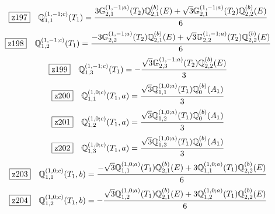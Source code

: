 \documentclass[fleqn,10pt,landscape]{jsarticle}
\begin{document}
\begin{dmath*}
\hspace*{3mm}\fbox{z197}\quad \mathbb{Q}_{1,1}^{(1,-1;c)}(T_{1})=\frac{3 \mathbb{G}_{2,1}^{(1,-1;a)}(T_{2}) \mathbb{Q}_{2,1}^{(b)}(E) + \sqrt{3} \mathbb{G}_{2,1}^{(1,-1;a)}(T_{2}) \mathbb{Q}_{2,2}^{(b)}(E)}{6}
\end{dmath*}
\begin{dmath*}
\hspace*{3mm}\fbox{z198}\quad \mathbb{Q}_{1,2}^{(1,-1;c)}(T_{1})=\frac{- 3 \mathbb{G}_{2,2}^{(1,-1;a)}(T_{2}) \mathbb{Q}_{2,1}^{(b)}(E) + \sqrt{3} \mathbb{G}_{2,2}^{(1,-1;a)}(T_{2}) \mathbb{Q}_{2,2}^{(b)}(E)}{6}
\end{dmath*}
\begin{dmath*}
\hspace*{3mm}\fbox{z199}\quad \mathbb{Q}_{1,3}^{(1,-1;c)}(T_{1})=- \frac{\sqrt{3} \mathbb{G}_{2,3}^{(1,-1;a)}(T_{2}) \mathbb{Q}_{2,2}^{(b)}(E)}{3}
\end{dmath*}
\begin{dmath*}
\hspace*{3mm}\fbox{z200}\quad \mathbb{Q}_{1,1}^{(1,0;c)}(T_{1},a)=\frac{\sqrt{3} \mathbb{Q}_{1,1}^{(1,0;a)}(T_{1}) \mathbb{Q}_{0}^{(b)}(A_{1})}{3}
\end{dmath*}
\begin{dmath*}
\hspace*{3mm}\fbox{z201}\quad \mathbb{Q}_{1,2}^{(1,0;c)}(T_{1},a)=\frac{\sqrt{3} \mathbb{Q}_{1,2}^{(1,0;a)}(T_{1}) \mathbb{Q}_{0}^{(b)}(A_{1})}{3}
\end{dmath*}
\begin{dmath*}
\hspace*{3mm}\fbox{z202}\quad \mathbb{Q}_{1,3}^{(1,0;c)}(T_{1},a)=\frac{\sqrt{3} \mathbb{Q}_{1,3}^{(1,0;a)}(T_{1}) \mathbb{Q}_{0}^{(b)}(A_{1})}{3}
\end{dmath*}
\begin{dmath*}
\hspace*{3mm}\fbox{z203}\quad \mathbb{Q}_{1,1}^{(1,0;c)}(T_{1},b)=\frac{- \sqrt{3} \mathbb{Q}_{1,1}^{(1,0;a)}(T_{1}) \mathbb{Q}_{2,1}^{(b)}(E) + 3 \mathbb{Q}_{1,1}^{(1,0;a)}(T_{1}) \mathbb{Q}_{2,2}^{(b)}(E)}{6}
\end{dmath*}
\begin{dmath*}
\hspace*{3mm}\fbox{z204}\quad \mathbb{Q}_{1,2}^{(1,0;c)}(T_{1},b)=- \frac{\sqrt{3} \mathbb{Q}_{1,2}^{(1,0;a)}(T_{1}) \mathbb{Q}_{2,1}^{(b)}(E) + 3 \mathbb{Q}_{1,2}^{(1,0;a)}(T_{1}) \mathbb{Q}_{2,2}^{(b)}(E)}{6}
\end{dmath*}
\end{document}

